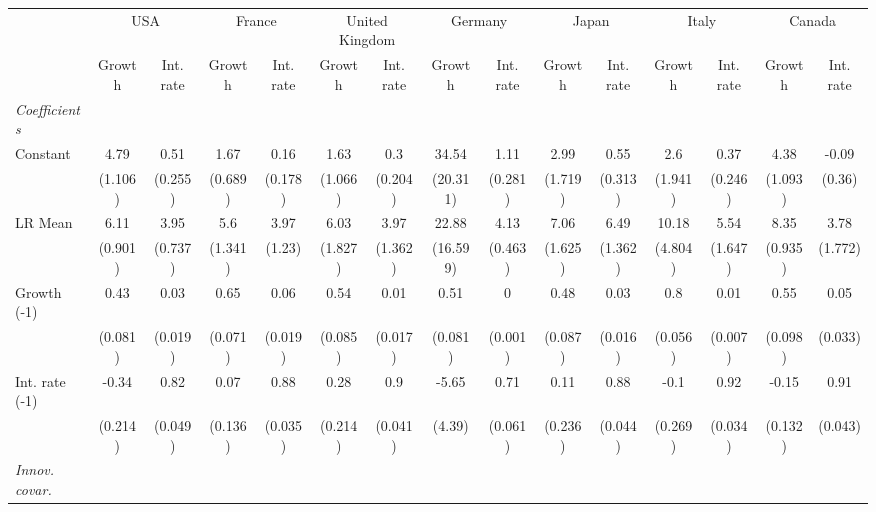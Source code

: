 \begin{table}[htbp] 
	\centering
	 \scriptsize
	\begin{tabular}{@{\extracolsep{4pt}}lcccccccccccccc@{}}		\hline\hline
		 		 & \multicolumn{2}{c}{USA} &\multicolumn{2}{c}{France} &\multicolumn{2}{c}{United Kingdom} &\multicolumn{2}{c}{Germany} &\multicolumn{2}{c}{Japan} &\multicolumn{2}{c}{Italy} &\multicolumn{2}{c}{Canada} \\ 
 		 & Growth 	 & Int. rate 	 & Growth 	 & Int. rate 	 & Growth 	 & Int. rate 	 & Growth 	 & Int. rate 	 & Growth 	 & Int. rate 	 & Growth 	 & Int. rate 	 & Growth 	 & Int. rate\\\cline{2-3}\cline{4-5}\cline{6-7}\cline{8-9}\cline{10-11}\cline{12-13}\cline{14-15}
\rule{0pt}{4ex} 
 \emph{Coefficients} 	  		 & 		 & 		 & 		 & 		 & 		 & 		 & 		 & 		 & 		 & 		 & 		 & 		 & 		 &\\ 
\quad Constant 	 & 4.79 	 & 0.51 	 & 1.67 	 & 0.16 	 & 1.63 	 & 0.3 	 & 34.54 	 & 1.11 	 & 2.99 	 & 0.55 	 & 2.6 	 & 0.37 	 & 4.38 	 & -0.09	 \\ 
 		 & (1.106) 	 & (0.255) 	 & (0.689) 	 & (0.178) 	 & (1.066) 	 & (0.204) 	 & (20.311) 	 & (0.281) 	 & (1.719) 	 & (0.313) 	 & (1.941) 	 & (0.246) 	 & (1.093) 	 & (0.36) 	 \\ 
\quad LR Mean 	 & 6.11 	 & 3.95 	 & 5.6 	 & 3.97 	 & 6.03 	 & 3.97 	 & 22.88 	 & 4.13 	 & 7.06 	 & 6.49 	 & 10.18 	 & 5.54 	 & 8.35 	 & 3.78	 \\ 
 		 & (0.901) 	 & (0.737) 	 & (1.341) 	 & (1.23) 	 & (1.827) 	 & (1.362) 	 & (16.599) 	 & (0.463) 	 & (1.625) 	 & (1.362) 	 & (4.804) 	 & (1.647) 	 & (0.935) 	 & (1.772) 	 \\ 
\quad Growth (-1) 	 &0.43 	 & 0.03 	 & 0.65 	 & 0.06 	 & 0.54 	 & 0.01 	 & 0.51 	 & 0 	 & 0.48 	 & 0.03 	 & 0.8 	 & 0.01 	 & 0.55 	 & 0.05	 \\ 
 		 & (0.081) 	 & (0.019) 	 & (0.071) 	 & (0.019) 	 & (0.085) 	 & (0.017) 	 & (0.081) 	 & (0.001) 	 & (0.087) 	 & (0.016) 	 & (0.056) 	 & (0.007) 	 & (0.098) 	 & (0.033) 	 \\ 
\quad Int. rate (-1) 	 &-0.34 	 & 0.82 	 & 0.07 	 & 0.88 	 & 0.28 	 & 0.9 	 & -5.65 	 & 0.71 	 & 0.11 	 & 0.88 	 & -0.1 	 & 0.92 	 & -0.15 	 & 0.91	 \\ 
 		 & (0.214) 	 & (0.049) 	 & (0.136) 	 & (0.035) 	 & (0.214) 	 & (0.041) 	 & (4.39) 	 & (0.061) 	 & (0.236) 	 & (0.044) 	 & (0.269) 	 & (0.034) 	 & (0.132) 	 & (0.043) 	 \\ 
\rule{0pt}{4ex} \emph{Innov. covar.}  	 & 	 & 	 & 	 & 	 & 	 & 	 & 	 & 	 & 	 & 	 & 	 & 	 & 	 &\\ 

\end{tabular}
\end{table}
